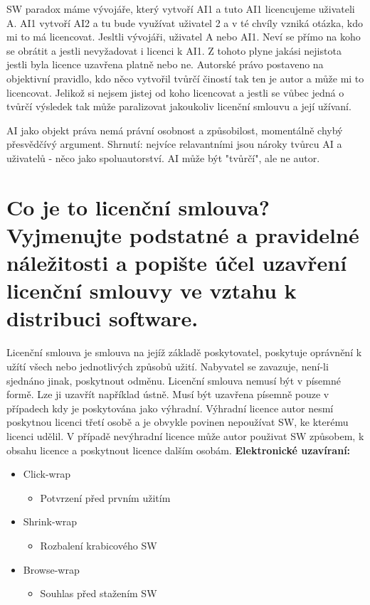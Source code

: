 \documentclass[12pt,a4paper,czech]{article}
\newcommand{\nadpis}[1]{{\section{#1}}}
\begin{document}
SW paradox máme vývojáře, který vytvoří AI1 a tuto AI1 licencujeme uživateli A. AI1 vytvoří AI2 a tu bude využívat uživatel 2 a v té chvíly vzniká otázka, kdo mi to má licencovat. Jesltli vývojáři, uživatel A nebo AI1. Neví se přímo na koho se obrátit a jestli nevyžadovat i licenci k AI1. Z tohoto plyne jakási nejistota jestli byla licence uzavřena platně nebo ne. Autorské právo postaveno na objektivní pravidlo, kdo něco vytvořil tvůrčí čiností tak ten je autor a může mi to licencovat. Jelikož si nejsem jistej od koho licencovat a jestli se vůbec jedná o tvůrčí výsledek tak může paralizovat jakoukoliv licenční smlouvu a její užívaní.

AI jako objekt práva nemá právní osobnost a způsobilost, momentálně chybý přesvědčívý argument. 
Shrnutí: nejvíce relavantními jsou nároky tvůrcu AI a uživatelů - něco jako spoluautorství. AI může být "tvůrčí", ale ne autor.

\newpage
\nadpis{Co je to licenční smlouva? Vyjmenujte podstatné a pravidelné náležitosti a popište účel uzavření licenční smlouvy ve vztahu k distribuci software.}

Licenční smlouva je smlouva na jejíž základě poskytovatel, poskytuje oprávnění k užítí všech nebo jednotlivých způsobů užití. Nabyvatel se zavazuje, není-li sjednáno jinak, poskytnout odměnu. 
Licenční smlouva nemusí být v písemné formě. Lze ji uzavřít například ústně. Musí být uzavřena písemně pouze v případech kdy je poskytována jako výhradní. Výhradní licence autor nesmí poskytnou licenci třetí osobě a je obvykle povinen nepoužívat SW, ke kterému licenci udělil. V případě nevýhradní licence může autor použivat SW způsobem, k obsahu licence a poskytnout licence dalším osobám. 
\newline
\newline
\textbf{Elektronické uzavíraní:}
\begin{itemize}
    \item Click-wrap
    \begin{itemize}
        \item Potvrzení před prvním užitím
    \end{itemize}
    \item Shrink-wrap
    \begin{itemize}
        \item Rozbalení krabicového SW
    \end{itemize}
    \item Browse-wrap
    \begin{itemize}
        \item Souhlas před stažením SW
    \end{itemize}
\end{itemize}
  
\end{document}
